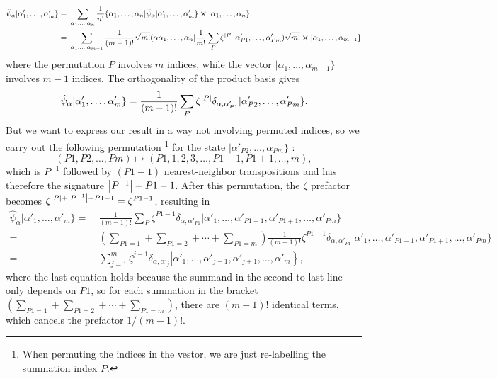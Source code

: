 \documentclass{article}
\theoremstyle{definition}
\numberwithin{equation}{section}
\begin{document}
\begin{align*}
    \hat{\psi}_{\alpha}
    |\alpha'_{1}, \ldots ,\alpha'_{m}\}
    =&\ 
    \sum_{\alpha_1, \ldots ,\alpha_{n}}
    \frac{1}{n!}
    \{\alpha_1, \ldots ,\alpha_{n}|
    \hat{\psi}_{\alpha}|
    \alpha'_{1}, \ldots ,\alpha'_{m}\}
    \cross 
    |\alpha_1, \ldots ,\alpha_{n}\} \\
    =&\ 
    \sum_{\alpha_1, \ldots ,\alpha_{m-1}}
    \frac{1}{(m-1)!}
    \sqrt{m!}
    (\alpha \alpha_1, \ldots ,\alpha_n
    |\frac{1}{m!}\sum_{P}\zeta^{\abs{P}}|
    \alpha'_{P1}, \ldots ,\alpha'_{Pm})
    \sqrt{m!}
    \cross 
    |\alpha_1, \ldots ,\alpha_{m-1}\}
\end{align*}
where the permutation $P$ involves $m$ indices, 
while the vector 
$|\alpha_1, \ldots ,\alpha_{m-1}\}$ 
involves $m-1$ indices. The orthogonality of 
the product basis gives 
\begin{align*}
    \hat{\psi}_{\alpha}
    |\alpha'_{1}, \ldots ,\alpha'_{m}\}
    =
    \frac{1}{(m-1)!}
    \sum_{P}\zeta^{\abs{P}}
    \delta_{\alpha,\alpha'_{P1}}
    |\alpha'_{P2}, \ldots ,\alpha'_{Pm}\}.
\end{align*}
But we want to express our result in a way 
not involving permuted indices, 
so we carry out the following permutation
\footnote{
    When permuting the indices in the vestor, 
    we are just 
    re-labelling the summation index $P$.
}
for the state 
$|\alpha'_{P2}, \ldots ,\alpha_{Pm}\}$ 
:
\[
    (P1, P2,\ldots ,Pm)
    \mapsto
    (P1,1,2,3, \ldots ,
    P1-1,P1+1, \ldots ,m),
\]
which is $P^{-1}$ followed by 
$(P1-1)$ nearest-neighbor transpositions and has 
therefore the signature $\abs{P ^{-1}}+P1-1$. 
After this permutation, the $\zeta$ prefactor becomes 
$\zeta^{\abs{P}+\abs{P ^{-1}} + P1 -1} = \zeta^{P1-1}$, 
resulting in
\begin{align*}
    \hat{\psi}_{\alpha}
    |\alpha'_{1}, \ldots ,\alpha'_{m}\}
    =&\ 
    \frac{1}{(m-1)!}
    \sum_{P}
    \zeta^{P1-1}
    \delta_{\alpha,\alpha'_{P1}}
    |\alpha'_{1}, \ldots ,
    \alpha'_{P1-1},\alpha'_{P1+1}, \ldots ,
    \alpha'_{Pm}\} \\
    =&\ 
    \left(\sum_{P1=1}+
    \sum_{P1=2}+ \cdots +
    \sum_{P1=m}\right) 
    \frac{1}{(m-1)!}
    \zeta^{P1-1}
    \delta_{\alpha,\alpha'_{P1}}
    |\alpha'_{1}, \ldots ,
    \alpha'_{P1-1},\alpha'_{P1+1}, \ldots ,
    \alpha'_{Pm}\} \\
    =&\ 
    \sum_{j=1}^{m}
    \zeta^{j-1}
    \delta_{\alpha,\alpha'_{j}}
    \left|\alpha'_{1}, \ldots ,\alpha'_{j-1},
    \alpha'_{j+1}, \ldots ,\alpha'_{m}\right\},
\end{align*}
where the last equation holds because 
the summand 
in the second-to-last line only depends on $P1$, 
so for each summation in the bracket 
$
    \left(\sum_{P1=1}+
    \sum_{P1=2}+ \cdots +
    \sum_{P1=m}\right) 
$,
there are $(m-1)!$ identical terms, which 
cancels the prefactor $1 /(m-1)!$.
\end{document}
